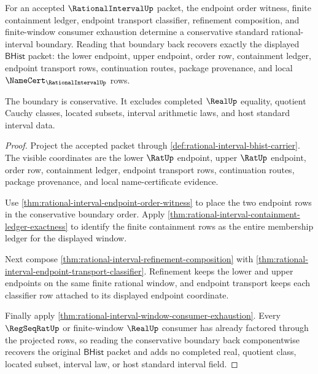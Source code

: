\begin{theorem}
\label{thm:rational-interval-standard-boundary-bridge}
For an accepted $\RationalIntervalUp$ packet, the endpoint order witness, finite
containment ledger, endpoint transport classifier, refinement composition, and
finite-window consumer exhaustion determine a conservative standard
rational-interval boundary. Reading that boundary back recovers exactly the
displayed $\mathsf{BHist}$ packet: the lower endpoint, upper endpoint, order
row, containment ledger, endpoint transport rows, continuation routes, package
provenance, and local $\NameCert_{\RationalIntervalUp}$ rows.

The boundary is conservative. It excludes completed $\RealUp$ equality,
quotient Cauchy classes, located subsets, interval arithmetic laws, and host
standard interval data.
\end{theorem}
\begin{proof}
Project the accepted packet through
\autoref{def:rational-interval-bhist-carrier}. The visible coordinates are the
lower $\RatUp$ endpoint, upper $\RatUp$ endpoint, order row, containment ledger,
endpoint transport rows, continuation routes, package provenance, and local
name-certificate evidence.

Use \autoref{thm:rational-interval-endpoint-order-witness} to place the two
endpoint rows in the conservative boundary order. Apply
\autoref{thm:rational-interval-containment-ledger-exactness} to identify the
finite containment rows as the entire membership ledger for the displayed
window.

Next compose \autoref{thm:rational-interval-refinement-composition} with
\autoref{thm:rational-interval-endpoint-transport-classifier}. Refinement keeps
the lower and upper endpoints on the same finite rational window, and endpoint
transport keeps each classifier row attached to its displayed endpoint
coordinate.

Finally apply
\autoref{thm:rational-interval-window-consumer-exhaustion}. Every
$\RegSeqRatUp$ or finite-window $\RealUp$ consumer has already factored through
the projected rows, so reading the conservative boundary back componentwise
recovers the original $\mathsf{BHist}$ packet and adds no completed real,
quotient class, located subset, interval law, or host standard interval field.
\end{proof}

